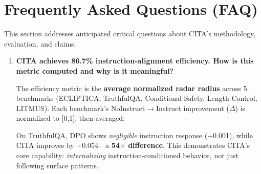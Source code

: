 
\vspace{-2mm}
\section{Frequently Asked Questions (FAQ)}
\label{sec:faq}

This section addresses anticipated critical questions about CITA's methodology, evaluation, and claims.

\vspace{4mm}

\begin{enumerate}[label=\textbf{Q\arabic*.}, leftmargin=*, itemsep=8pt]

\item \textbf{CITA achieves 86.7\% instruction-alignment efficiency. How is this metric computed and why is it meaningful?}

 The efficiency metric is the \textbf{average normalized radar radius} across 5 benchmarks (ECLIPTICA, TruthfulQA, Conditional Safety, Length Control, LITMUS). Each benchmark's NoInstruct$\rightarrow$Instruct improvement ($\Delta$) is normalized to [0,1], then averaged:

\begin{table}[ht!]
\centering
\normalsize
\renewcommand{\arraystretch}{1.2}
\caption{CITA vs DPO improvement deltas across key benchmarks.}
\label{tab:faq_benchmark_deltas}
\end{table}

On TruthfulQA, DPO shows \textit{negligible} instruction response (+0.001), while CITA improves by +0.054---a \textbf{54$\times$ difference}. This demonstrates CITA's core capability: \textit{internalizing} instruction-conditioned behavior, not just following surface patterns.


\end{enumerate}
